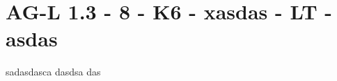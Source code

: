 \section{AG-L 1.3 - 8 - K6 - xasdas - LT - asdas}

\begin{beispiel}[AG-L 1.3]{1}
sadasdasca
dasdsa
das

\end{beispiel}